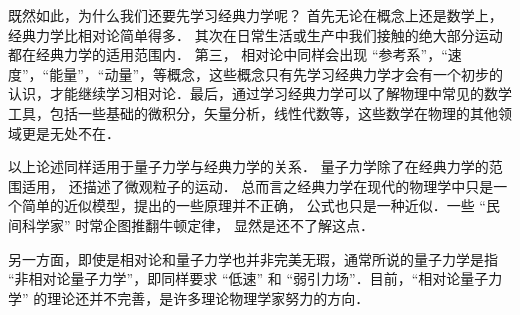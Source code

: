 既然如此，为什么我们还要先学习经典力学呢？ 首先无论在概念上还是数学上，经典力学比相对论简单得多． 其次在日常生活或生产中我们接触的绝大部分运动都在经典力学的适用范围内． 第三， 相对论中同样会出现 “参考系”，“速度”，“能量”，“动量”，等概念，这些概念只有先学习经典力学才会有一个初步的认识，才能继续学习相对论．最后，通过学习经典力学可以了解物理中常见的数学工具，包括一些基础的微积分，矢量分析，线性代数等，这些数学在物理的其他领域更是无处不在．

以上论述同样适用于量子力学与经典力学的关系． 量子力学除了在经典力学的范围适用， 还描述了微观粒子的运动． 总而言之经典力学在现代的物理学中只是一个简单的近似模型，提出的一些原理并不正确， 公式也只是一种近似．一些 “民间科学家” 时常企图推翻牛顿定律， 显然是还不了解这点．

另一方面，即使是相对论和量子力学也并非完美无瑕，通常所说的量子力学是指 “非相对论量子力学”，即同样要求 “低速” 和 “弱引力场”．目前，“相对论量子力学” 的理论还并不完善，是许多理论物理学家努力的方向．
